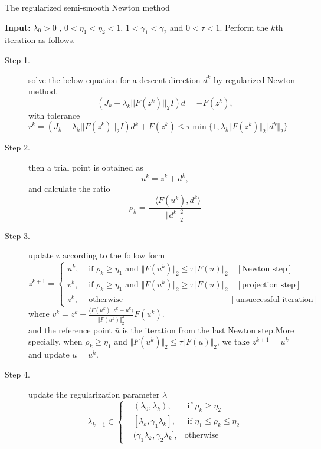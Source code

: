 \documentclass[a4paper]{article}
\begin{document}
\begin{algorithm}[htb!]
	\caption{The regularized semi-smooth Newton method}
	\textbf{Input:} $ \lambda_0 > 0 $ , $0<\eta_1<\eta_2<1$, $1<\gamma_1<\gamma_2$ and $0<\tau<1$. Perform the $k$th iteration as follows.
	\begin{description}
		\item[Step 1.]  solve the below equation for a descent direction $d^k$ by regularized Newton method.
	\begin{equation*}
	(J_k + \lambda_k||F(z^k)||_2I)d=-F(z^k),
	\end{equation*}
		with tolerance $ r^k = (J_k + \lambda_k||F(z^k)||_2I)d^k+F(z^k) \leq \tau \min\{1, \lambda_k \Vert F(z^k)\Vert_2 \Vert d^k\Vert_2 \} $		
		
	\item[Step 2.]  then a trial point is obtained as
	\begin{equation*}
	u^k=z^k+d^k,
	\end{equation*}
	and calculate the ratio
	\begin{equation*}
	\rho_k=\frac{-\langle F(u^k),d^k\rangle}{\Vert d^k\Vert_2^2}
	\end{equation*}
		\item[Step 3.] update z according to the follow form
		\begin{equation}
		z^{k+1}=\left\{\begin{aligned}
		u^k,&  \textrm{ if } \rho_k\geq \eta_1 \textrm{ and } \Vert F(u^k)\Vert_2\leq \tau \Vert F(\bar{u})\Vert_2  \quad [\textrm{Newton step}]\\
		v^k,& \textrm{ if } \rho_k\geq \eta_1 \textrm{ and } \Vert F(u^k)\Vert_2\geq \tau \Vert F(\bar{u})\Vert_2   \quad [\textrm{projection  step}]\\
		z^k,& \textrm{ otherwise}\qquad  \qquad  \qquad\quad  \qquad\qquad\qquad  [\textrm{unsuccessful  iteration}]
		\end{aligned}\right.
		\end{equation}
		where $v^k = z^k - \frac{\langle F(u^k),z^k-u^k\rangle}{\Vert F(u^k)\Vert^2_2}F(u^k)$.\\
		and the reference point $\bar{u}$ is the iteration from the last Newton step.More specially, when 
		$\rho_k\geq \eta_1$ and $\Vert F(u^k)\Vert_2\leq \tau \Vert F(\bar{u})\Vert_2$, we take $z^{k+1}=u^k$ and update $\bar{u} = u^k $. 
	\item[Step 4.] update the regularization parameter $\lambda$
	\begin{equation}
	\lambda_{k+1} \in
	\left\{
	\begin{aligned}
	&(\lambda_0,\lambda_k),           &\textrm{ if } \rho_k\geq\eta_2 \\
	&[\lambda_k,\gamma_1\lambda_k],  &\textrm{ if } \eta_1\leq\rho_k\le\eta_2\\
	&(\gamma_1\lambda_k,\gamma_2\lambda_k], &\textrm{otherwise}
	\end{aligned}
	\right.
	\end{equation}
	\end{description}
\end{algorithm}
\end{document}
